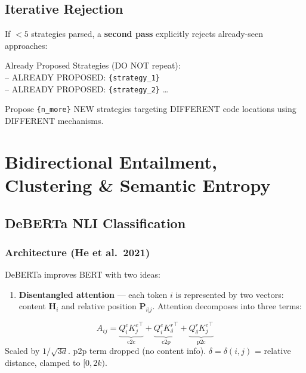 \documentclass[10pt,a4paper,twocolumn]{article}
\begin{document}
\subsection{Iterative Rejection}

If $<5$ strategies parsed, a \textbf{second pass} explicitly rejects already-seen approaches:

\begin{promptbox}[title=Rejection Clause]
\scriptsize
Already Proposed Strategies (DO NOT repeat):\\
-- ALREADY PROPOSED: \texttt{\{strategy\_1\}}\\
-- ALREADY PROPOSED: \texttt{\{strategy\_2\}} \ldots

Propose \texttt{\{n\_more\}} NEW strategies targeting DIFFERENT code locations using DIFFERENT mechanisms.
\end{promptbox}


\section{Bidirectional Entailment, Clustering \& Semantic Entropy}

\subsection{DeBERTa NLI Classification}

\subsubsection{Architecture (He et al.\ 2021)}

DeBERTa improves BERT with two ideas:

\begin{enumerate}[nosep,leftmargin=10pt]
\item \textbf{Disentangled attention} --- each token $i$ is represented by two vectors: content $\bm{H}_i$ and relative position $\bm{P}_{i|j}$. Attention decomposes into three terms:
\end{enumerate}

\begin{mathbox}[title=Disentangled Attention]
{\small
\[
A_{ij} = \underbrace{Q_i^c {K_j^c}^\top}_{\text{c2c}} + \underbrace{Q_i^c {K_{\delta}^r}^\top}_{\text{c2p}} + \underbrace{Q_{\delta}^r {K_j^c}^\top}_{\text{p2c}}
\]
}
{\scriptsize Scaled by $1/\sqrt{3d}$. p2p term dropped (no content info). $\delta{=}\delta(i,j)$ = relative distance, clamped to $[0, 2k)$.}
\end{mathbox}
\end{document}
